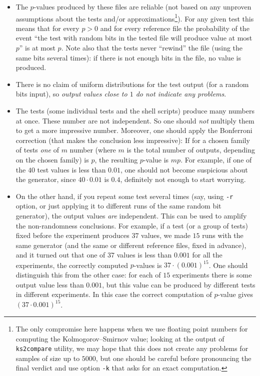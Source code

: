 \documentclass[12pt,a4paper,fullpage]{article}
\begin{document}
\begin{itemize}

\item The $p$-values produced by these files are reliable (not based on any unproven assumptions about the tests and/or approximations\footnote{The only compromise here happens when we use floating point numbers for computing the Kolmogorov--Smirnov value; looking at the output of \texttt{ks2compare} utility, we may hope that this does not create any problems for samples of size up to $5000$, but one should be careful before pronouncing the final verdict and use option \texttt{-k} that asks for an exact computation.}). For any given test this means that for every $p>0$ and for every reference file the probability of the event ``the test with random bits in the tested file will produce value at most $p$'' is at most $p$. Note also that the tests never ``rewind'' the file (using the same bits several times): if there is not enough bits in the file, no value is produced.

\item There is no claim of uniform distributions for the test output (for a random bits input), so \emph{output values close to $1$ do not indicate any problems}.

\item The tests (some individual tests and the shell scripts) produce many numbers at once. These number are not independent. So one should \emph{not} multiply them to get a more impressive number. Moreover, one should apply the Bonferroni correction (that makes the conclusion less impressive): If for a chosen family of tests \emph{one} of $m$ number (where $m$ is the total number of outputs, depending on the chosen family) is $p$, the resulting $p$-value is $mp$.  For example, if one of the $40$ test values is less than $0.01$, one should not become suspicious about the generator, since $40\cdot 0.01$ is $0.4$, definitely not enough to start worrying.

\item On the other hand, if you repeat some test several times (say, using \texttt{-r} option, or just applying it to different runs of the same random bit generator), the output values \emph{are} independent. This can be used to amplify the non-randomness conclusions. For example, if a test (or a group of tests) fixed before the experiment produces $37$ values, we made $15$ runs with the same generator (and the same or different reference files, fixed in advance), and it turned out that one of $37$ values is less than $0.001$ for all the experiments, the correctly computed $p$-values is $37\cdot(0.001)^{15}$. One should distinguish this from the other case: for each of $15$ experiments there is some output value less than $0.001$, but this value can be produced by different tests in different experiments. In this case the correct computation of $p$-value gives $(37\cdot0.001)^{15}$.


\end{itemize}
\end{document}
